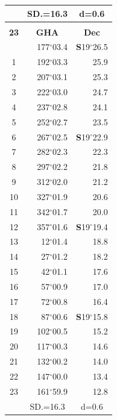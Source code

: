 \documentclass[10pt, a4paper]{report}
\begin{document}
\begin{scriptsize}
\begin{tabular*}{0.2\textwidth}[t]{@{\extracolsep{\fill}}|c|rr|}
\hline
\rule{0pt}{2.4ex} & \multicolumn{1}{c}{SD.=16.3} & \multicolumn{1}{c|}{d=0.6}\\
\hline
\multicolumn{1}{c}{}\\[-0.5ex]\hline
\multicolumn{1}{|c|}{\rule{0pt}{2.6ex}\textbf{23}} & \multicolumn{1}{c}{\textbf{GHA}} & \multicolumn{1}{c|}{\textbf{Dec}}\\
\hline\rule{0pt}{2.6ex}\noindent
0 & 177$^\circ$03.4 & \textbf{S}19$^\circ$26.5\\
1 & 192$^\circ$03.3 & 25.9\\
2 & 207$^\circ$03.1 & 25.3\\
3 & 222$^\circ$03.0 & \raisebox{0.24ex}{\boldmath$\cdot$~\boldmath$\cdot$~~}24.7\\
4 & 237$^\circ$02.8 & 24.1\\
5 & 252$^\circ$02.7 & 23.5\\[2Pt]
6 & 267$^\circ$02.5 & \textbf{S}19$^\circ$22.9\\
7 & 282$^\circ$02.3 & 22.3\\
8 & 297$^\circ$02.2 & 21.8\\
9 & 312$^\circ$02.0 & \raisebox{0.24ex}{\boldmath$\cdot$~\boldmath$\cdot$~~}21.2\\
10 & 327$^\circ$01.9 & 20.6\\
11 & 342$^\circ$01.7 & 20.0\\[2Pt]
12 & 357$^\circ$01.6 & \textbf{S}19$^\circ$19.4\\
13 & 12$^\circ$01.4 & 18.8\\
14 & 27$^\circ$01.2 & 18.2\\
15 & 42$^\circ$01.1 & \raisebox{0.24ex}{\boldmath$\cdot$~\boldmath$\cdot$~~}17.6\\
16 & 57$^\circ$00.9 & 17.0\\
17 & 72$^\circ$00.8 & 16.4\\[2Pt]
18 & 87$^\circ$00.6 & \textbf{S}19$^\circ$15.8\\
19 & 102$^\circ$00.5 & 15.2\\
20 & 117$^\circ$00.3 & 14.6\\
21 & 132$^\circ$00.2 & \raisebox{0.24ex}{\boldmath$\cdot$~\boldmath$\cdot$~~}14.0\\
22 & 147$^\circ$00.0 & 13.4\\
23 & 161$^\circ$59.9 & 12.8\\
\hline
\rule{0pt}{2.4ex} & \multicolumn{1}{c}{SD.=16.3} & \multicolumn{1}{c|}{d=0.6}\\
\hline
\end{tabular*}\noindent
\begin{tabular*}{0.2\textwidth}[t]{@{\extracolsep{\fill}}|c|rr|}

\end{tabular*}
\end{scriptsize}
\end{document}
